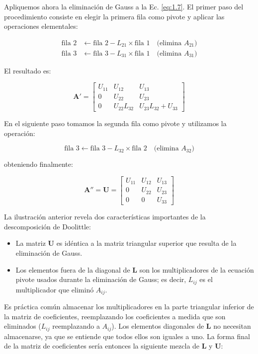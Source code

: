 \documentclass[12pt,letterpaper]{article}
\theoremstyle{definition}
\theoremstyle{plain}
\theoremstyle{remark}
\begin{document}
Apliquemos ahora la eliminación de Gauss a la Ec. \eqref{eq:1.7}. El primer paso del procedimiento consiste en elegir la primera fila como pivote y aplicar las operaciones elementales:

\begin{align*}
\text{fila 2} &\leftarrow \text{fila 2} - L_{21} \times \text{fila 1} \quad \text{(elimina } A_{21}) \\
\text{fila 3} &\leftarrow \text{fila 3} - L_{31} \times \text{fila 1} \quad \text{(elimina } A_{31})
\end{align*}

El resultado es:

\[
\mathbf{A}' = 
\begin{bmatrix}
U_{11} & U_{12} & U_{13} \\
0 & U_{22} & U_{23} \\
0 & U_{22}L_{32} & U_{23}L_{32} + U_{33}
\end{bmatrix}
\]

En el siguiente paso tomamos la segunda fila como pivote y utilizamos la operación:

\[
\text{fila 3} \leftarrow \text{fila 3} - L_{32} \times \text{fila 2} \quad \text{(elimina } A_{32})
\]

obteniendo finalmente:

\[
\mathbf{A}'' = \mathbf{U} = 
\begin{bmatrix}
U_{11} & U_{12} & U_{13} \\
0 & U_{22} & U_{23} \\
0 & 0 & U_{33}
\end{bmatrix}
\]

La ilustración anterior revela dos características importantes de la descomposición de Doolittle:

\begin{itemize}
  \item La matriz $\mathbf{U}$ es idéntica a la matriz triangular superior que resulta de la eliminación de Gauss.
  \item Los elementos fuera de la diagonal de $\mathbf{L}$ son los multiplicadores de la ecuación pivote usados durante la eliminación de Gauss; es decir, $L_{ij}$ es el multiplicador que eliminó $A_{ij}$.
\end{itemize}

Es práctica común almacenar los multiplicadores en la parte triangular inferior de la matriz de coeficientes, reemplazando los coeficientes a medida que son eliminados ($L_{ij}$ reemplazando a $A_{ij}$). Los elementos diagonales de $\mathbf{L}$ no necesitan almacenarse, ya que se entiende que todos ellos son iguales a uno. La forma final de la matriz de coeficientes sería entonces la siguiente mezcla de $\mathbf{L}$ y $\mathbf{U}$:
\end{document}
